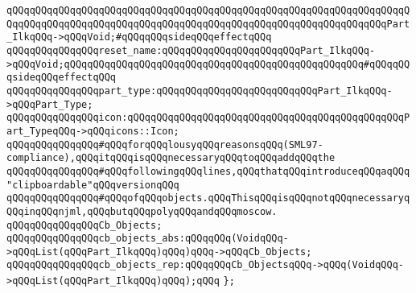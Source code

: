 \verb|qQQqqQQqqQQqqQQqqQQqqQQqqQQqqQQqqQQqqQQqqQQqqQQqqQQqqQQqqQQqqQQqqQQqqQQqqQQqqQQqqQQqqQQqqQQqqQQqqQQqqQQqqQQqqQQqqQQqqQQqqQQqqQQqqQQqqQQqPart_IlkqQQq->qQQqVoid;#qQQqqQQqsideqQQqeffectqQQq|\newline
\verb|qQQqqQQqqQQqqQQqreset_name:qQQqqQQqqQQqqQQqqQQqqQQqPart_IlkqQQq->qQQqVoid;qQQqqQQqqQQqqQQqqQQqqQQqqQQqqQQqqQQqqQQqqQQqqQQqqQQq#qQQqqQQqsideqQQqeffectqQQq|\newline
\verb|qQQqqQQqqQQqqQQqpart_type:qQQqqQQqqQQqqQQqqQQqqQQqqQQqPart_IlkqQQq->qQQqPart_Type;|\newline
\verb|qQQqqQQqqQQqqQQqicon:qQQqqQQqqQQqqQQqqQQqqQQqqQQqqQQqqQQqqQQqqQQqqQQqPart_TypeqQQq->qQQqicons::Icon;|\newline
\newline
\newline
\verb|qQQqqQQqqQQqqQQq#qQQqforqQQqlousyqQQqreasonsqQQq(SML97-compliance),qQQqitqQQqisqQQqnecessaryqQQqtoqQQqaddqQQqthe|\newline
\verb|qQQqqQQqqQQqqQQq#qQQqfollowingqQQqlines,qQQqthatqQQqintroduceqQQqaqQQq"clipboardable"qQQqversionqQQq|\newline
\verb|qQQqqQQqqQQqqQQq#qQQqofqQQqobjects.qQQqThisqQQqisqQQqnotqQQqnecessaryqQQqinqQQqnjml,qQQqbutqQQqpolyqQQqandqQQqmoscow.|\newline
\newline
\verb|qQQqqQQqqQQqqQQqCb_Objects;|\newline
\newline
\verb|qQQqqQQqqQQqqQQqcb_objects_abs:qQQqqQQq(VoidqQQq->qQQqList(qQQqPart_IlkqQQq)qQQq)qQQq->qQQqCb_Objects;|\newline
\verb|qQQqqQQqqQQqqQQqcb_objects_rep:qQQqqQQqCb_ObjectsqQQq->qQQq(VoidqQQq->qQQqList(qQQqPart_IlkqQQq)qQQq);qQQq|\newline
\verb|};|\newline
\newline

